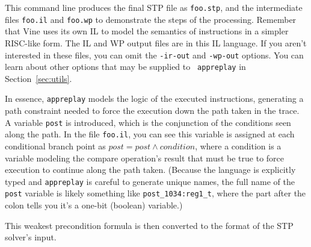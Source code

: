 This command line produces the final STP file as \verb'foo.stp', and
the intermediate files \verb'foo.il' and \verb'foo.wp' to demonstrate
the steps of the processing.
Remember that Vine
uses its own IL to model the semantics of instructions in a
simpler RISC-like form.  The IL and WP output files are in this IL
language. If you aren't interested in these files, you can omit the
\verb'-ir-out' and \verb'-wp-out' options.
You can learn about other options that may be supplied to {\tt
appreplay} in Section~\ref {sec:utils}.

In essence, \texttt{appreplay} models the logic of the executed
instructions, generating a path constraint needed to force the
execution down the path taken in the trace.  A variable \verb'post' is
introduced, which is the conjunction of the conditions seen along the
path. In the file \verb'foo.il', you can see this variable is assigned
at each conditional branch point as $post = post \wedge condition$,
where a condition is a variable modeling the compare operation's
result that must be true to force execution to continue along the path
taken. (Because the language is explicitly typed and \verb'appreplay'
is careful to generate unique names, the full name of the \verb'post'
variable is likely something like \verb'post_1034:reg1_t', where the
part after the colon tells you it's a one-bit (boolean) variable.)

This weakest precondition formula is then converted to the format of
the STP solver's input.

